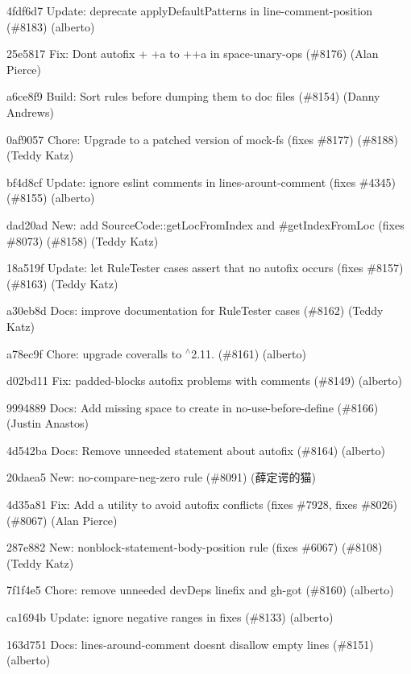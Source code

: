\begin{DoxyItemize}
\item 4fdf6d7 Update\+: deprecate {\ttfamily apply\+Default\+Patterns} in {\ttfamily line-\/comment-\/position} (\#8183) (alberto)
\item 25e5817 Fix\+: Don\textquotesingle{}t autofix {\ttfamily + +a} to {\ttfamily ++a} in space-\/unary-\/ops (\#8176) (Alan Pierce)
\item a6ce8f9 Build\+: Sort rules before dumping them to doc files (\#8154) (Danny Andrews)
\item 0af9057 Chore\+: Upgrade to a patched version of mock-\/fs (fixes \#8177) (\#8188) (Teddy Katz)
\item bf4d8cf Update\+: ignore eslint comments in lines-\/arount-\/comment (fixes \#4345) (\#8155) (alberto)
\item dad20ad New\+: add Source\+Code\+::get\+Loc\+From\+Index and \#get\+Index\+From\+Loc (fixes \#8073) (\#8158) (Teddy Katz)
\item 18a519f Update\+: let Rule\+Tester cases assert that no autofix occurs (fixes \#8157) (\#8163) (Teddy Katz)
\item a30eb8d Docs\+: improve documentation for Rule\+Tester cases (\#8162) (Teddy Katz)
\item a78ec9f Chore\+: upgrade {\ttfamily coveralls} to $^\wedge$2.11. (\#8161) (alberto)
\item d02bd11 Fix\+: padded-\/blocks autofix problems with comments (\#8149) (alberto)
\item 9994889 Docs\+: Add missing space to {\ttfamily create} in {\ttfamily no-\/use-\/before-\/define} (\#8166) (Justin Anastos)
\item 4d542ba Docs\+: Remove unneeded statement about autofix (\#8164) (alberto)
\item 20daea5 New\+: no-\/compare-\/neg-\/zero rule (\#8091) (薛定谔的猫)
\item 4d35a81 Fix\+: Add a utility to avoid autofix conflicts (fixes \#7928, fixes \#8026) (\#8067) (Alan Pierce)
\item 287e882 New\+: nonblock-\/statement-\/body-\/position rule (fixes \#6067) (\#8108) (Teddy Katz)
\item 7f1f4e5 Chore\+: remove unneeded dev\+Deps {\ttfamily linefix} and {\ttfamily gh-\/got} (\#8160) (alberto)
\item ca1694b Update\+: ignore negative ranges in fixes (\#8133) (alberto)
\item 163d751 Docs\+: {\ttfamily lines-\/around-\/comment} doesn\textquotesingle{}t disallow empty lines (\#8151) (alberto)

\end{DoxyItemize}
